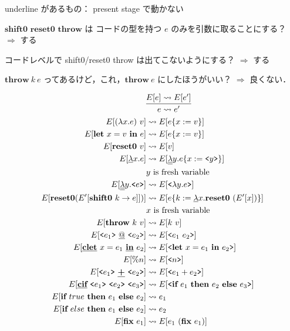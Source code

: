 \documentclass[10pt,a4j]{jarticle}
\makeatletter
\newcommand\fun[2]{\lambda{#1}.{#2}}
\newcommand\Resetz{\textbf{reset0}}
\newcommand\Shiftz{\textbf{shift0}}
\newcommand\Throw{\textbf{throw}}
\newcommand\resetz[1]{\Resetz~{#1}}
\newcommand\cfun[2]{\underline{\lambda}{#1}.{#2}}
\newcommand\ccfun[2]{\underline{\underline{\lambda}}{#1}.{#2}}
\newcommand\cResetz{\underline{\textbf{reset0}}}
\newcommand\cShiftz{\underline{\textbf{shift0}}}
\newcommand\cThrow{\underline{\textbf{throw}}}
\newcommand\cPlus{\underline{\textbf{+}}}
\newcommand\cLet{\underline{\textbf{clet}}}
\newcommand\cIn{\underline{\textbf{in}}}
\newcommand\clet[3]{\cLet~{#1}={#2}~\cIn~{#3}}
\newcommand\code[1]{\texttt{<}{#1}\texttt{>}}
\newcommand\Let{\textbf{let}}
\newcommand\In{\textbf{in}}
\newcommand\letin[3]{\Let~{#1}={#2}~\In~{#3}}
\newcommand\ift[3]{\textbf{if}~{#1}~\textbf{then}~{#2}~\textbf{else}~{#3}}
\newcommand\cif[3]{\underline{\textbf{cif}}~\code{{#1}}~\code{{#2}}~\code{{#3}}}
\newcommand\fix{\textbf{fix}}
\newcommand\lto{\leadsto}
\newcommand\cat{~\underline{@}~}
\theoremstyle{break}
\makeatother
\begin{document}
underline があるもの： present stage で動かない

$\Shiftz$ $\Resetz$ $\Throw$ は コードの型を持つ $e$ のみを引数に取ることにする？ $\Rightarrow$ する

コードレベルで shift0/reset0 throw は出てこないようにする？ $\Rightarrow$ する

$\Throw~ k~ e$ ってあるけど，これ，$\Throw~ e$ にしたほうがいい？ $\Rightarrow$ 良くない．

\begin{align*}
  & \infer{e \lto e'}
    {E[e] \lto E[e']} \\
  E[(\fun{x}{e})~v] &\lto E[e\{ x := v \}] \\
  E[\letin{x}{v}{e}] &\lto E[e\{ x := v \}]\\
  E[\Resetz~ v] &\lto E[v] \\
  E[\cfun{x}{e}] &\lto E[\ccfun{y}{e\{ x := \code{y} \}}] \\
                    &y \text{ is fresh variable} \\
  E[\ccfun{y}{\code{e}}] &\lto E[\code{\fun{y}{e}}] \\
  E[\Resetz (E'[\Shiftz~ k \to e]])] &\lto E[e \{k := \cfun{x}{\Resetz~ (E'[x])} \}] \\
                    &x \text{ is fresh variable} \\
  E[\Throw~ k~ v] &\lto E[k~ v] \\
  E[\code{e_1} \cat \code{e_2}] &\lto E[\code{e_1~ e_2}] \\
  E[\clet{x}{e_1}{e_2}] &\lto E[\code{\letin{x}{e_1}{e_2}}] \\
  E[\% n] &\lto E[\code{n}] \\
  E[\code{e_1}~ \cPlus~ \code{e_2}] &\lto E[\code{e_1 + e_2}] \\
  E[\cif{e_1}{e_2}{e_3}] &\lto E[\code{\ift{e_1}{e_2}{e_3}}] \\
  E[\ift{true}{e_1}{e_2}] &\lto e_1 \\
  E[\ift{else}{e_1}{e_2}] &\lto e_2 \\
  E[\fix~ e_1] &\lto E[e_1~ (\fix~ e_1)] \\
\end{align*}
\end{document}
